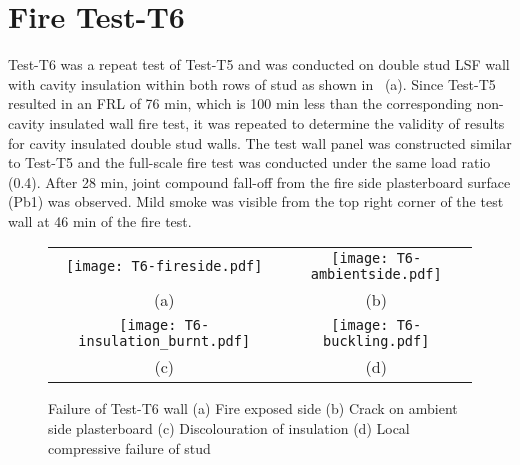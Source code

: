 \section{Fire Test-T6}

Test-T6 was a repeat test of Test-T5 and was conducted on double stud LSF wall with cavity insulation within both rows of stud as shown in ~(a). Since Test-T5 resulted in an FRL of 76 min, which is 100 min less than the corresponding non-cavity insulated wall fire test, it was repeated to determine the validity of results for cavity insulated double stud walls. The test wall panel was constructed similar to Test-T5 and the full-scale fire test was conducted under the same load ratio (0.4). After 28 min, joint compound fall-off from the fire side plasterboard surface (Pb1) was observed. Mild smoke was visible from the top right corner of the test wall at 46 min of the fire test. 
\begin{figure}[!htbp]
	\centering	
		\begin{tabular}{cc}
			\texttt{[image: T6-fireside.pdf]} & 
			\texttt{[image: T6-ambientside.pdf]} \\ 
			(a) & (b) \\
			\texttt{[image: T6-insulation\_burnt.pdf]} & 
			\texttt{[image: T6-buckling.pdf]} \\
			(c) & (d) \\
		\end{tabular}
		\caption{Failure of Test-T6 wall (a) Fire exposed side (b) Crack on ambient side plasterboard (c) Discolouration of insulation (d) Local compressive failure of stud}
		\label{fig:T6-failure}
\end{figure}

